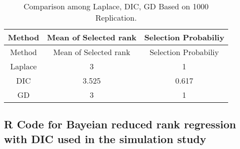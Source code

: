\documentclass[]{book}
\begin{document}
\begin{longtable}[]{@{}ccc@{}}
\caption{\label{tab:table2} Comparison among Laplace, DIC, GD Based on 1000 Replication.}\tabularnewline
\toprule
Method & Mean of Selected rank & Selection Probabiliy\tabularnewline
\midrule
\endfirsthead
\toprule
Method & Mean of Selected rank & Selection Probabiliy\tabularnewline
\midrule
\endhead
Laplace & 3 & 1\tabularnewline
DIC & 3.525 & 0.617\tabularnewline
GD & 3 & 1\tabularnewline
\bottomrule
\end{longtable}

\hypertarget{r-code-for-bayeian-reduced-rank-regression-with-dic-used-in-the-simulation-study}{%
\subsection{R Code for Bayeian reduced rank regression with DIC used in the simulation study}\label{r-code-for-bayeian-reduced-rank-regression-with-dic-used-in-the-simulation-study}}
\end{document}
